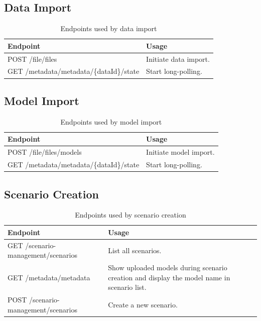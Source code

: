 \subsection{Data Import}
\begin{table}[H]
	\caption{Endpoints used by data import}
	\begin{tabularx}{\textwidth}{|l|X|}
		\hline
		\textbf{Endpoint} & \textbf{Usage} \\ \hline
		POST /file/files & Initiate data import.\\ \hline
		GET /metadata/metadata/\{dataId\}/state & Start long-polling. \\ \hline
	\end{tabularx}
\end{table}


\subsection{Model Import}
\begin{table}[H]
	\caption{Endpoints used by model import}
	\begin{tabularx}{\textwidth}{|l|X|}
		\hline
		\textbf{Endpoint} & \textbf{Usage} \\ \hline
		POST /file/files/models & Initiate model import. \\ \hline
		GET /metadata/metadata/\{dataId\}/state & Start long-polling. \\ \hline
	\end{tabularx}
\end{table}


\subsection{Scenario Creation}
\begin{table}[H]
	\caption{Endpoints used by scenario creation}
	\begin{tabularx}{\textwidth}{|l|X|}
		\hline
		\textbf{Endpoint} & \textbf{Usage} \\ \hline
		GET /scenario-management/scenarios & List all scenarios. \\ \hline
		GET /metadata/metadata & Show uploaded models during scenario creation and display  the model name in scenario list. \\ \hline
		POST /scenario-management/scenarios & Create a new scenario. \\ \hline
	\end{tabularx}
\end{table}


